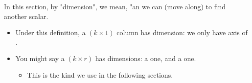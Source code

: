 \begin{clarification}
            \boxdiv
            
            In this section, by "dimension", we mean, "an  we can  (move along) to find another scalar.
            
            \begin{itemize}
                \item Under this definition, a $(k \times 1)$ column  has  dimension: we only have  axis of .
                
                \item You might say a $(k \times r)$  has  dimensions: a  one, and a  one.
                    \begin{itemize}
                        \item This  is the kind we use in the following sections.
                    \end{itemize}
            \end{itemize}
        \end{clarification}
        